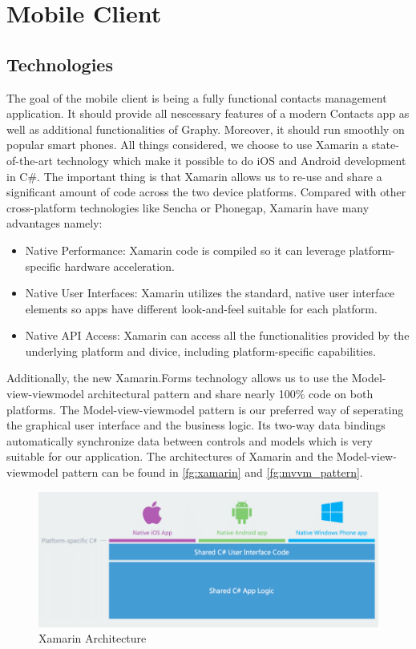 \section{Mobile Client}
\subsection{Technologies}
The goal of the mobile client is being a fully functional contacts management application. It should provide all nescessary features of a modern Contacts app as well as additional functionalities of Graphy. Moreover, it should run smoothly on popular smart phones. All things considered, we choose to use Xamarin a state-of-the-art technology which make it possible to do iOS and Android development in C\#. The important thing is that Xamarin allows us to re-use and share a significant amount of code across the two device platforms. Compared with other cross-platform technologies like Sencha or Phonegap, Xamarin have many advantages namely:

\begin{itemize}
\item Native Performance: Xamarin code is compiled so it can leverage platform-specific hardware acceleration.
\item Native User Interfaces: Xamarin utilizes the standard, native user interface elements so apps have different look-and-feel suitable for each platform.
\item Native API Access: Xamarin can access all the functionalities provided by the underlying platform and divice, including platform-specific capabilities.
\end{itemize}

Additionally, the new Xamarin.Forms technology allows us to use the Model-view-viewmodel architectural pattern and share nearly 100\% code on both platforms. The Model-view-viewmodel pattern is our preferred way of seperating the graphical user interface and the business logic. Its two-way data bindings automatically synchronize data between controls and models which is very suitable for our application. The architectures of Xamarin and the Model-view-viewmodel pattern can be found in \autoref{fg:xamarin} and \autoref{fg:mvvm_pattern}.

\begin{figure}[!h]
\begin{centering}
\includegraphics[scale=0.55]{pics/xamarin.png}
\caption{Xamarin Architecture}\label{fg:xamarin}
\end{centering}
\end{figure}

